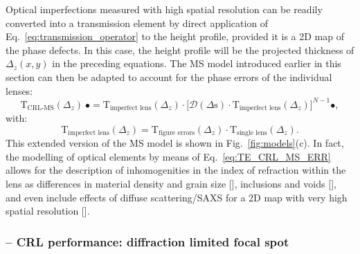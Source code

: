 \begin{refsection}
Optical imperfections measured with high spatial resolution can be readily converted into a transmission element by direct application of Eq.~\ref{eq:transmission_operator} to the height profile, provided it is a 2D map of the phase defects. In this case, the height profile will be the projected thickness of $\Delta_z(x,y)$ in the preceding equations. The MS model introduced earlier in this section can then be adapted to account for the phase errors of the individual lenses:
\begin{equation}\label{eq:TE_CRL_MS_ERR}
    \mathrm{T}_{\text{CRL-MS}}(\Delta_z)~\bullet = \mathrm{T}_{\text{imperfect lens}}(\Delta_z)\cdot\big[\mathcal{D}({\Delta}\text{s})\cdot\mathrm{T}_{\text{imperfect lens}}(\Delta_z)\big]^{N-1}\bullet,
\end{equation}{}
with:
\begin{equation}
    \mathrm{T}_{\text{imperfect lens}}(\Delta_z) = \mathrm{T}_{\text{figure errors}}(\Delta_z)\cdot\mathrm{T}_{\text{single lens}}(\Delta_z).
\end{equation}{}
This extended version of the MS model is shown in Fig.~\ref{fig:models}(c). In fact, the modelling of optical elements by means of  Eq.~\ref{eq:TE_CRL_MS_ERR} allows for the description of inhomogenities in the index of refraction within the lens as differences in material density and grain size [\cite{Lyatun2020}], inclusions and voids [\cite{Roth2014}], and even include effects of diffuse scattering/SAXS for a 2D map with very high spatial resolution [\cite{Paganin2019}].

\subsubsection*{-- CRL performance: diffraction limited focal spot}


\end{refsection}
